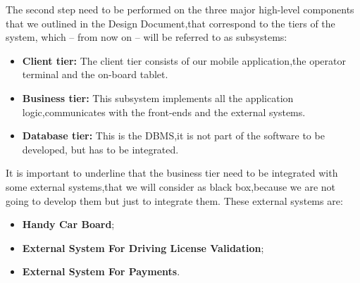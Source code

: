 The second step need to be performed on the three major high-level components that we outlined in the Design Document,that correspond to the tiers of the system, which – from now on – will
be referred to as subsystems:
\begin{itemize}
\item \textbf{Client tier:} The client tier consists of our mobile application,the operator terminal and the on-board tablet.
\item\textbf{Business tier:} This subsystem implements all the application logic,communicates with the front-ends and the external systems.
\item \textbf{Database tier:} This is the DBMS,it is not part of the software to be developed,
but has to be integrated.
\end{itemize}
It is important to underline that the business tier need to be integrated with some external systems,that we will consider as black box,because we are not going to develop them but just to integrate them. These external systems are:
\begin{itemize}
\item \textbf{Handy Car Board};
\item \textbf{External System For Driving License Validation};
\item \textbf{External System For Payments}.
\end{itemize}


